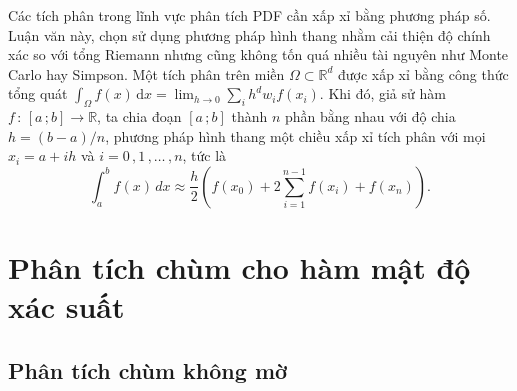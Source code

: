 \documentclass[a4paper,oneside]{book} %
\theoremstyle{plain}
\theoremstyle{plain}
\theoremstyle{nonumberplain}
\begin{document}
Các tích phân trong lĩnh vực phân tích PDF cần xấp xỉ bằng phương pháp số. Luận văn này, chọn sử dụng phương pháp hình thang nhằm cải thiện độ chính xác so với tổng Riemann nhưng cũng không tốn quá nhiều tài nguyên như Monte Carlo hay Simpson. Một tích phân trên miền $\Omega \subset \mathbb{R}^d$ được xấp xỉ bằng công thức tổng quát
$ \int_{\Omega}f(x)\mathrm{\,d}x = \lim_{h\to0}\sum_{i}h^d w_if(x_i)$. Khi đó, giả sử hàm $f\,:\,[a\,;b]\to \mathbb{R}$, ta chia đoạn $[a\,;b]$ thành $n$ phần bằng nhau với độ chia $h=(b-a)/n$, phương pháp hình thang một chiều xấp xỉ tích phân với mọi $x_i = a + ih$ và $i=0\,,1\,,\ldots\,,n$, tức là
	$$
	\int_a^b f(x)\, dx \approx \frac{h}{2} \left( f(x_0) + 2 \sum_{i=1}^{n-1} f(x_i) + f(x_n) \right).
	$$







%
%


%
%
%
%
%
%
%
%
%
%
%    






\section{Phân tích chùm cho hàm mật độ xác suất}


\subsection{Phân tích chùm không mờ}
\end{document}
